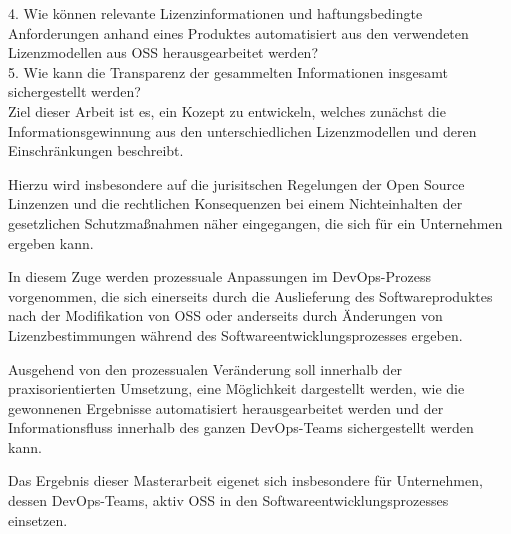 

4. Wie können relevante Lizenzinformationen und haftungsbedingte Anforderungen anhand eines Produktes automatisiert aus den verwendeten Lizenzmodellen aus OSS herausgearbeitet werden?\\ 



5. Wie kann die Transparenz der gesammelten Informationen insgesamt sichergestellt werden?\\ 


Ziel dieser Arbeit ist es, ein Kozept zu entwickeln, welches zunächst die Informationsgewinnung aus den unterschiedlichen Lizenzmodellen und deren Einschränkungen beschreibt. 

Hierzu wird insbesondere auf die jurisitschen Regelungen der Open Source Linzenzen und die rechtlichen Konsequenzen bei einem Nichteinhalten der gesetzlichen Schutzmaßnahmen näher eingegangen, die sich für ein Unternehmen ergeben kann.

In diesem Zuge werden prozessuale Anpassungen im DevOps-Prozess vorgenommen, die sich einerseits durch die Auslieferung des Softwareproduktes nach der Modifikation von OSS oder anderseits durch Änderungen von Lizenzbestimmungen während des Softwareentwicklungsprozesses ergeben. 

Ausgehend von den prozessualen Veränderung soll innerhalb der praxisorientierten Umsetzung, eine Möglichkeit dargestellt werden, wie die gewonnenen Ergebnisse automatisiert herausgearbeitet werden und der Informationsfluss innerhalb des ganzen DevOps-Teams sichergestellt werden kann. 

Das Ergebnis dieser Masterarbeit eigenet sich insbesondere für Unternehmen, dessen DevOps-Teams, aktiv OSS in den Softwareentwicklungsprozesses einsetzen.
 